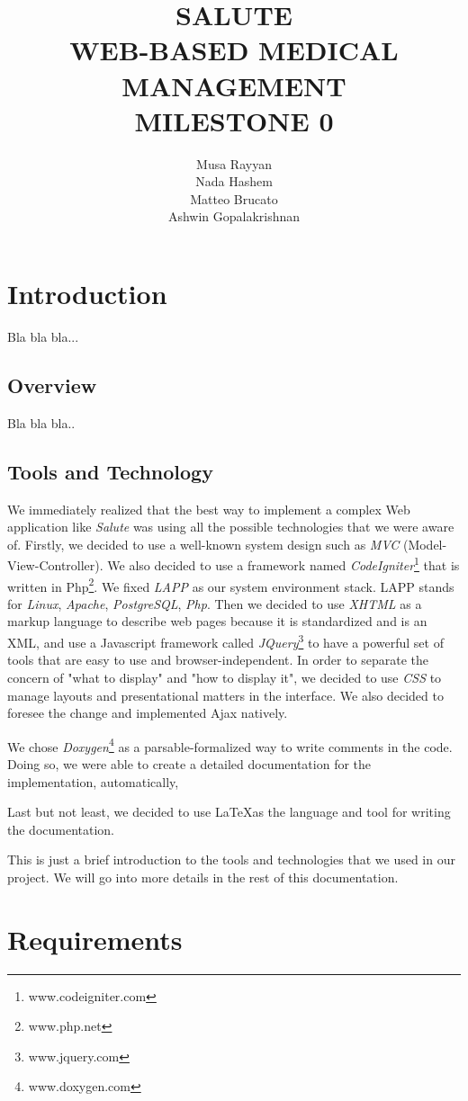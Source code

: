 \documentclass[12pt]{report}
\title{SALUTE \\ WEB-BASED MEDICAL MANAGEMENT \\ MILESTONE 0}
\author{Musa Rayyan \\ Nada Hashem \\ Matteo Brucato \\ Ashwin Gopalakrishnan}
\begin{document}
\maketitle
\tableofcontents


\part{Introduction}
Bla bla bla...
\chapter{Overview}
Bla bla bla..
\chapter{Tools and Technology}
We immediately realized that the best way to implement a complex Web application like \emph{Salute} was using all the possible technologies that we were aware of. Firstly, we decided to use a well-known system design such as \emph{MVC} (Model-View-Controller). We also decided to use a framework named \emph{CodeIgniter}\footnote{www.codeigniter.com} that is written in Php\footnote{www.php.net}. We fixed \emph{LAPP} as our system environment stack. LAPP stands for \emph{Linux}, \emph{Apache}, \emph{PostgreSQL}, \emph{Php}. Then we decided to use \emph{XHTML} as a markup language to describe web pages because it is standardized and is an XML, and use a Javascript framework called \emph{JQuery}\footnote{www.jquery.com} to have a powerful set of tools that are easy to use and browser-independent. In order to separate the concern of "what to display" and "how to display it", we decided to use \emph{CSS} to manage layouts and presentational matters in the interface. We also decided to foresee the change and implemented Ajax natively.

We chose \emph{Doxygen}\footnote{www.doxygen.com} as a parsable-formalized way to write comments in the code. Doing so, we were able to create a detailed documentation for the implementation, automatically,

Last but not least, we decided to use \LaTeX as the language and tool for writing the documentation.

This is just a brief introduction to the tools and technologies that we used in our project. We will go into more details in the rest of this documentation.


\part{Requirements}
\end{document}
